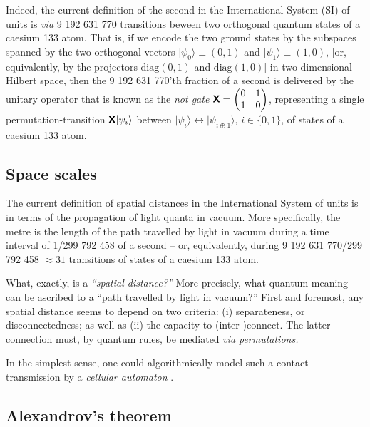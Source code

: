 \documentclass[%
  twocolumn,
 showpacs,
 showkeys,
 preprintnumbers,
 amsmath,amssymb,
 aps,
 prl,
  longbibliography,
 ]{revtex4-1}
\theoremstyle{definition}
\theoremstyle{remark}
\begin{document}
Indeed, the current definition of the second in the International System (SI) of units
is {\it via} 9 192 631 770 transitions beween two orthogonal quantum states of a caesium 133 atom.
That is, if we encode the two ground states by the subspaces spanned by the two orthogonal vectors
$\vert \psi_0 \rangle \equiv (0,1)$ and $\vert \psi_1 \rangle \equiv (1,0)$,
[or, equivalently, by the projectors $\text{diag}(0,1)$    and  $\text{diag}(1,0)$]
in two-dimensional Hilbert space,
then the 9 192 631 770'th fraction of a second is delivered by the unitary operator that is known as the
{\em not gate} \cite{mermin-07} $\textsf{\textbf{X}}
=   \begin{pmatrix}0& 1\\1&0
\end{pmatrix}
$,
representing a single permutation-transition $\textsf{\textbf{X}}\vert \psi_i \rangle $  between $\vert \psi_i \rangle  \leftrightarrow \vert \psi_{i\oplus 1} \rangle $,
$i\in \{ 0, 1\}$,
of states of a caesium 133 atom.

\subsection{Space scales}

The current definition of spatial distances in the International System of units
is in terms of the propagation of light quanta in vacuum.
More specifically, the metre is the length of the path travelled by light in vacuum during a time interval of 1/299 792 458 of a second
--
or, equivalently, during
9 192 631 770/299 792 458 $\approx 31$ transitions of states of a caesium 133 atom.

What, exactly, is a {\em ``spatial distance?''}
More precisely, what quantum meaning can be ascribed to a ``path travelled by light in vacuum?''
First and foremost, any spatial distance seems to depend on two criteria:
(i) separateness, or disconnectedness; as well as
(ii) the capacity to (inter-)connect.
The latter connection must, by quantum rules,
be mediated {\it via} {\em permutations.}

In the simplest sense, one could algorithmically model such a contact transmission by a {\em cellular automaton}
\cite{fredkin,svozil-1996-time,thooft-2013}.


\subsection{Alexandrov's theorem}
\end{document}
